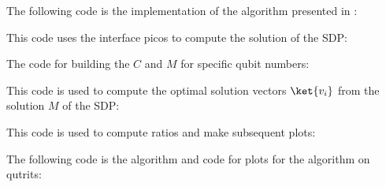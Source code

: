 The following code is the implementation of the algorithm presented in \cite{bravyi19}:

\bigskip
This code uses the interface picos to compute the solution of the SDP:

\bigskip
The code for building the $C$ and $M$ for specific qubit numbers:

\bigskip
This code is used to compute the optimal solution vectors $\ket{v_i}$ from the solution $M$ of the SDP:

\bigskip
This code is used to compute ratios and make subsequent plots:

\bigskip
The following code is the algorithm and code for plots for the algorithm on qutrits:

